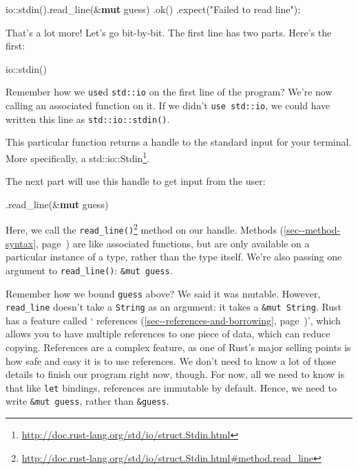 \documentclass[a4paper,]{book}
\renewcommand*{\hyperref}[2][\ar]{%
  \def\ar{#2}%
  #2 (\autoref{#1}, page~\pageref{#1})}
\newenvironment{Shaded}{\begin{snugshade}}{\end{snugshade}}
\newcommand{\KeywordTok}[1]{\textcolor[rgb]{0.13,0.29,0.53}{\textbf{{#1}}}}
\newcommand{\StringTok}[1]{\textcolor[rgb]{0.31,0.60,0.02}{{#1}}}
\newcommand{\NormalTok}[1]{{#1}}
\renewcommand{\href}[2]{#2\footnote{\url{#1}}}
\begin{document}
\begin{Shaded}
\begin{Highlighting}[]
    \NormalTok{io::stdin().read_line(&}\KeywordTok{mut} \NormalTok{guess)}
        \NormalTok{.ok()}
        \NormalTok{.expect(}\StringTok{"Failed to read line"}\NormalTok{);}
\end{Highlighting}
\end{Shaded}

That's a lot more! Let's go bit-by-bit. The first line has two parts.
Here's the first:

\begin{Shaded}
\begin{Highlighting}[]
\NormalTok{io::stdin()}
\end{Highlighting}
\end{Shaded}

Remember how we \texttt{use}d \texttt{std::io} on the first line of the
program? We're now calling an associated function on it. If we didn't
\texttt{use\ std::io}, we could have written this line as
\texttt{std::io::stdin()}.

This particular function returns a handle to the standard input for your
terminal. More specifically, a
\href{http://doc.rust-lang.org/std/io/struct.Stdin.html}{std::io::Stdin}.

The next part will use this handle to get input from the user:

\begin{Shaded}
\begin{Highlighting}[]
\NormalTok{.read_line(&}\KeywordTok{mut} \NormalTok{guess)}
\end{Highlighting}
\end{Shaded}

Here, we call the
\href{http://doc.rust-lang.org/std/io/struct.Stdin.html\#method.read_line}{\texttt{read\_line()}}
method on our handle. \hyperref[sec--method-syntax]{Methods} are like
associated functions, but are only available on a particular instance of
a type, rather than the type itself. We're also passing one argument to
\texttt{read\_line()}: \texttt{\&mut\ guess}.

Remember how we bound \texttt{guess} above? We said it was mutable.
However, \texttt{read\_line} doesn't take a \texttt{String} as an
argument: it takes a \texttt{\&mut\ String}. Rust has a feature called
`\hyperref[sec--references-and-borrowing]{references}', which allows you
to have multiple references to one piece of data, which can reduce
copying. References are a complex feature, as one of Rust's major
selling points is how safe and easy it is to use references. We don't
need to know a lot of those details to finish our program right now,
though. For now, all we need to know is that like \texttt{let} bindings,
references are immutable by default. Hence, we need to write
\texttt{\&mut\ guess}, rather than \texttt{\&guess}.
\end{document}
